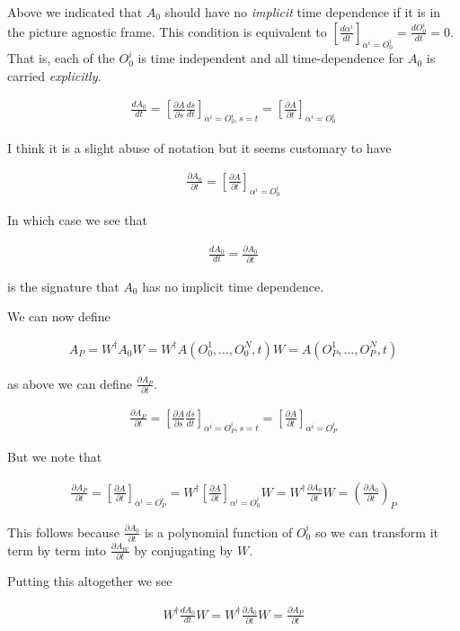 \documentclass[12pt]{article}
\newcommand{\ddt}[1]{\frac{d #1}{dt}}
\newcommand{\ppt}[1]{\frac{\partial #1}{\partial t}}
\begin{document}
Above we indicated that $A_0$ should have no \textit{implicit} time dependence if it is in the picture agnostic frame. This condition is equivalent to $\left[\ddt{\alpha^i}\right]_{\alpha^i=O^i_0} = \ddt{O^i_0}= 0$. That is, each of the $O^i_0$ is time independent and all time-dependence for $A_0$ is carried \textit{explicitly}.

\begin{align}
\ddt{A_0} = \left[\frac{\partial A}{\partial s} \ddt{s} \right]_{\alpha^i=O_0^i,s=t} = \left[\ppt{A}\right]_{\alpha^i=O_0^i}
\end{align}

I think it is a slight abuse of notation but it seems customary to have

\begin{align}
\ppt{A_0} = \left[\ppt{A} \right]_{\alpha^i=O^i_0}
\end{align}

In which case we see that

\begin{align}
\ddt{A_0} = \ppt{A_0}
\end{align}

is the signature that $A_0$ has no implicit time dependence.

We can now define 

\begin{align}
A_P = W^{\dag} A_0 W = W^{\dag} A(O_0^1,\ldots,O_0^N,t) W = A(O_P^1,\ldots, O_P^N,t)
\end{align}

as above we can define $\ppt{A_P}$.

\begin{align}
\ppt{A_P} = \left[\frac{\partial A}{\partial s} \ddt{s}\right]_{\alpha^i=O_P^i,s=t} = \left[\ppt{A} \right]_{\alpha^i = O_P^i}
\end{align}

But we note that

\begin{align}
\ppt{A_P} = \left[\ppt{A} \right]_{\alpha^i=O_P^i} = W^{\dag} \left[\ppt{A} \right]_{\alpha^i = O_0^i} W = W^{\dag} \ppt{A_0} W = \left(\ppt{A_0}\right)_P
\end{align}

This follows because $\ppt{A_0}$ is a polynomial function of $O_0^i$ so we can transform it term by term into $\ppt{A_W}$ by conjugating by $W$.

Putting this altogether we see

\begin{align}
W^{\dag}\ddt{A_0}W = W^{\dag}\ppt{A_0}W = \ppt{A_P}
\end{align}
\end{document}
